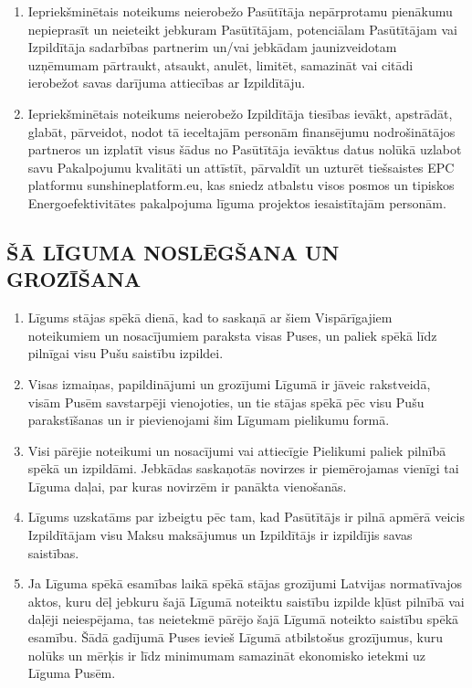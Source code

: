 \begin{multicols}{2}
\begin{enumerate}
	\item Iepriekšminētais noteikums neierobežo Pasūtītāja nepārprotamu pienākumu nepieprasīt un neieteikt jebkuram Pasūtītājam, potenciālam Pasūtītājam vai Izpildītāja sadarbības partnerim un/vai jebkādam jaunizveidotam uzņēmumam pārtraukt, atsaukt, anulēt, limitēt, samazināt vai citādi ierobežot savas darījuma attiecības ar Izpildītāju.
	\item Iepriekšminētais noteikums neierobežo Izpildītāja tiesības ievākt, apstrādāt, glabāt, pārveidot, nodot tā ieceltajām personām finansējumu nodrošinātājos partneros un izplatīt visus šādus no Pasūtītāja ievāktus datus nolūkā uzlabot savu Pakalpojumu kvalitāti un attīstīt, pārvaldīt un uzturēt tiešsaistes EPC platformu sunshineplatform.eu, kas sniedz atbalstu visos posmos un tipiskos Energoefektivitātes pakalpojuma līguma projektos iesaistītajām personām.
\end{enumerate}

\subsection{ŠĀ LĪGUMA NOSLĒGŠANA UN GROZĪŠANA}
\begin{enumerate}
	\item Līgums stājas spēkā dienā, kad to saskaņā ar šiem Vispārīgajiem noteikumiem un nosacījumiem paraksta visas Puses, un paliek spēkā līdz pilnīgai visu Pušu saistību izpildei.
	\item Visas izmaiņas, papildinājumi un grozījumi Līgumā ir jāveic rakstveidā, visām Pusēm savstarpēji vienojoties, un tie stājas spēkā pēc visu Pušu parakstīšanas un ir pievienojami šim Līgumam  pielikumu formā.
	\item Visi pārējie noteikumi un nosacījumi vai attiecīgie Pielikumi paliek pilnībā spēkā un izpildāmi. Jebkādas saskaņotās novirzes ir piemērojamas vienīgi tai Līguma daļai, par kuras novirzēm ir panākta vienošanās.
	\item Līgums uzskatāms par izbeigtu pēc tam, kad Pasūtītājs ir pilnā apmērā veicis Izpildītājam visu Maksu maksājumus un Izpildītājs ir izpildījis savas saistības.
	\item Ja Līguma spēkā esamības laikā spēkā stājas grozījumi Latvijas normatīvajos aktos, kuru dēļ jebkuru šajā Līgumā noteiktu saistību izpilde kļūst pilnībā vai daļēji neiespējama, tas neietekmē pārējo šajā Līgumā noteikto saistību spēkā esamību. Šādā gadījumā Puses ievieš Līgumā atbilstošus grozījumus, kuru nolūks un mērķis ir līdz minimumam samazināt ekonomisko ietekmi uz Līguma Pusēm.
\end{enumerate}


\end{multicols}
